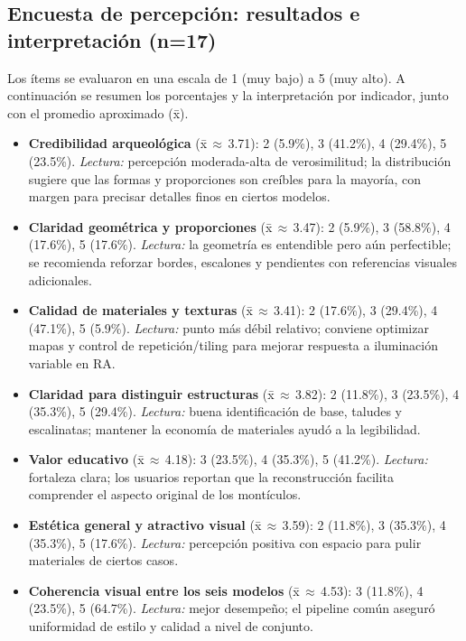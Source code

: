\subsection{Encuesta de percepción: resultados e interpretación (n=17)}
Los ítems se evaluaron en una escala de 1 (muy bajo) a 5 (muy alto). A continuación se resumen los porcentajes y la interpretación por indicador, junto con el promedio aproximado (\={x}).
\begin{itemize}
  \item \textbf{Credibilidad arqueológica} (\={x}\,$\approx$\,3.71): 2 (5.9\%), 3 (41.2\%), 4 (29.4\%), 5 (23.5\%). \emph{Lectura:} percepción moderada-alta de verosimilitud; la distribución sugiere que las formas y proporciones son creíbles para la mayoría, con margen para precisar detalles finos en ciertos modelos.
  \item \textbf{Claridad geométrica y proporciones} (\={x}\,$\approx$\,3.47): 2 (5.9\%), 3 (58.8\%), 4 (17.6\%), 5 (17.6\%). \emph{Lectura:} la geometría es entendible pero aún perfectible; se recomienda reforzar bordes, escalones y pendientes con referencias visuales adicionales.
  \item \textbf{Calidad de materiales y texturas} (\={x}\,$\approx$\,3.41): 2 (17.6\%), 3 (29.4\%), 4 (47.1\%), 5 (5.9\%). \emph{Lectura:} punto más débil relativo; conviene optimizar mapas y control de repetición/tiling para mejorar respuesta a iluminación variable en RA.
  \item \textbf{Claridad para distinguir estructuras} (\={x}\,$\approx$\,3.82): 2 (11.8\%), 3 (23.5\%), 4 (35.3\%), 5 (29.4\%). \emph{Lectura:} buena identificación de base, taludes y escalinatas; mantener la economía de materiales ayudó a la legibilidad.
  \item \textbf{Valor educativo} (\={x}\,$\approx$\,4.18): 3 (23.5\%), 4 (35.3\%), 5 (41.2\%). \emph{Lectura:} fortaleza clara; los usuarios reportan que la reconstrucción facilita comprender el aspecto original de los montículos.
  \item \textbf{Estética general y atractivo visual} (\={x}\,$\approx$\,3.59): 2 (11.8\%), 3 (35.3\%), 4 (35.3\%), 5 (17.6\%). \emph{Lectura:} percepción positiva con espacio para pulir materiales de ciertos casos.
  \item \textbf{Coherencia visual entre los seis modelos} (\={x}\,$\approx$\,4.53): 3 (11.8\%), 4 (23.5\%), 5 (64.7\%). \emph{Lectura:} mejor desempeño; el pipeline común aseguró uniformidad de estilo y calidad a nivel de conjunto.
\end{itemize}


